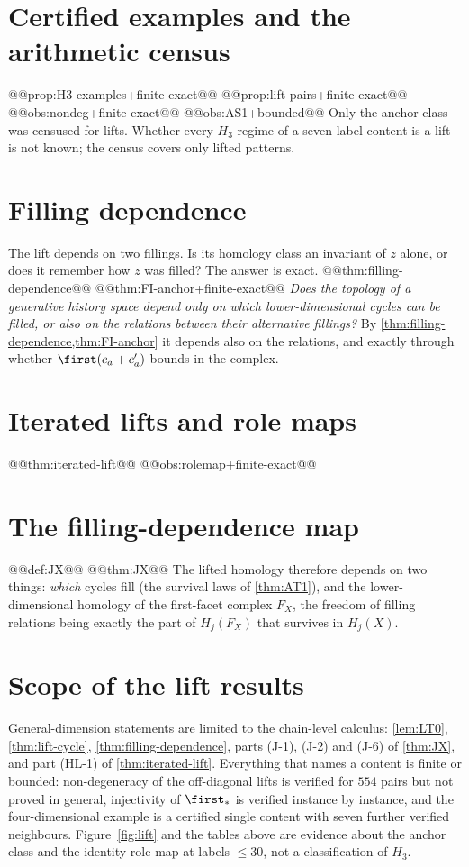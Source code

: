 \section{Certified examples and the arithmetic census}
@@prop:H3-examples+finite-exact@@
@@prop:lift-pairs+finite-exact@@
@@obs:nondeg+finite-exact@@
@@obs:AS1+bounded@@
Only the anchor class was censused for lifts. Whether every $H_3$ regime of a seven-label content is a lift is not known; the census covers only lifted patterns.

\section{Filling dependence}\label{sec:filldep}
The lift depends on two fillings. Is its homology class an invariant of $z$ alone, or does it remember how $z$ was filled? The answer is exact.
@@thm:filling-dependence@@
@@thm:FI-anchor+finite-exact@@
\emph{Does the topology of a generative history space depend only on which lower-dimensional cycles can be filled, or also on the relations between their alternative fillings?} By \cref{thm:filling-dependence,thm:FI-anchor} it depends also on the relations, and exactly through whether $\first(c_a+c_a')$ bounds in the complex.

\section{Iterated lifts and role maps}
@@thm:iterated-lift@@
@@obs:rolemap+finite-exact@@

\section{The filling-dependence map}\label{sec:JX}
@@def:JX@@
@@thm:JX@@
The lifted homology therefore depends on two things: \emph{which} cycles fill (the survival laws of \cref{thm:AT1}), and the lower-dimensional homology of the first-facet complex $F_X$, the freedom of filling relations being exactly the part of $H_j(F_X)$ that survives in $H_j(X)$.

\section{Scope of the lift results}
General-dimension statements are limited to the chain-level calculus: \cref{lem:LT0}, \cref{thm:lift-cycle}, \cref{thm:filling-dependence}, parts (J-1), (J-2) and (J-6) of \cref{thm:JX}, and part (HL-1) of \cref{thm:iterated-lift}. Everything that names a content is finite or bounded: non-degeneracy of the off-diagonal lifts is verified for $554$ pairs but not proved in general, injectivity of $\first_\ast$ is verified instance by instance, and the four-dimensional example is a certified single content with seven further verified neighbours. Figure~\ref{fig:lift} and the tables above are evidence about the anchor class and the identity role map at labels $\le30$, not a classification of $H_3$.

